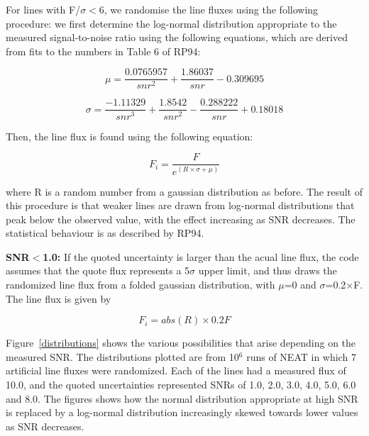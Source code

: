 \documentclass[useAMS,usenatbib]{mn2e}
\begin{document}
For lines with F/$\sigma < $6, we randomise the line fluxes using the following procedure: we first determine the log-normal distribution appropriate to the measured signal-to-noise ratio using the following equations, which are derived from fits to the numbers in Table 6 of RP94:

\begin{equation}
\mu = \frac{0.0765957}{snr^2} + \frac{1.86037}{snr} - 0.309695
\end{equation}

\begin{equation}
\sigma = \frac{-1.11329}{snr^3} + \frac{1.8542}{snr^2} - \frac{0.288222}{snr} + 0.18018
\end{equation}

Then, the line flux is found using the following equation:

\begin{equation}
F_i = \frac{F}{e^{(R\times\sigma + \mu)}}
\end{equation}

where R is a random number from a gaussian distribution as before.  The result of this procedure is that weaker lines are drawn from log-normal distributions that peak below the observed value, with the effect increasing as SNR decreases.  The statistical behaviour is as described by RP94.

{\bf SNR$<$1.0: } If the quoted uncertainty is larger than the acual line flux, the code assumes that the quote flux represents a 5$\sigma$ upper limit, and thus draws the randomized line flux from a folded gaussian distribution, with $\mu$=0 and $\sigma$=0.2$\times$F.  The line flux is given by

\begin{equation}
F_i = abs(R)\times0.2F
\end{equation}

Figure~\ref{distributions} shows the various possibilities that arise depending on the measured SNR.  The distributions plotted are from 10$^6$ runs of NEAT in which 7 artificial line fluxes were randomized.  Each of the lines had a measured flux of 10.0, and the quoted uncertainties represented SNRs of 1.0, 2.0, 3.0, 4.0, 5.0, 6.0 and 8.0.  The figures shows how the normal distribution appropriate at high SNR is replaced by a log-normal distribution increasingly skewed towards lower values as SNR decreases.
\end{document}

